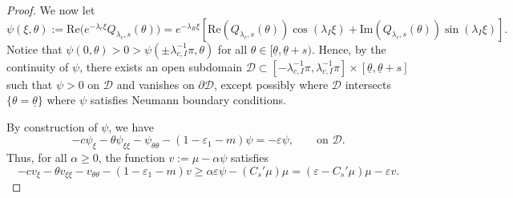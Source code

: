 \documentclass[11pt]{article}    %
\newcommand{\eps}{\varepsilon}
\begin{document}
\begin{proof}
We now let
\begin{equation*}
\psi(\xi,\theta):= \text{Re} \big( e^{- \lambda_c \xi} Q_{\lambda_c,s} \left( \theta \right)\big) = e^{-\lambda_{R} \xi}\left[ \text{Re} \left(Q_{\lambda_c,s}(\theta)\right) \cos (\lambda_{I} \xi) + \text{Im} \left(Q_{\lambda_c,s}(\theta)\right) \sin (\lambda_{I} \xi) \right].
\end{equation*} 
Notice that $\psi(0,\theta) > 0 > \psi(\pm \lambda_{c,I}^{-1} \pi, \theta)$ for all $\theta \in [\underline\theta, \underline\theta + s)$.
  Hence, by the continuity of $\psi$, there exists an open subdomain $\mathcal{D} \subset [-\lambda_{c,I}^{-1}\pi,\lambda_{c,I}^{-1}\pi]\times [\underline\theta, \underline\theta+s]$ such that $\psi>0$ on $\mathcal{D}$ and vanishes on $\partial \mathcal{D}$,
except possibly where $\mathcal{D}$ intersects $\lbrace \theta = \underline\theta \rbrace$ where $\psi$ satisfies Neumann boundary conditions.

By construction of $\psi$, we have
\begin{equation*}
- c \psi_\xi - \theta \psi_{\xi\xi} - \psi_{\theta \theta} - (1 - \eps_1 - m) \psi = - \eps \psi, \qquad \text{on } \mathcal{D}.
\end{equation*}
Thus, for all $\alpha \geq 0$, the function $v:= \mu - \alpha \psi$ satisfies
\begin{equation}\label{eq:chris}
- c v_\xi - \theta v_{\xi\xi} - v_{\theta \theta} - (1 - \eps_1 -m)v \geq \alpha \eps\psi - \left( C_s' \mu\right) \mu = \left( \eps - C_s' \mu\right) \mu - \eps v.
\end{equation}



\end{proof}
\end{document}
